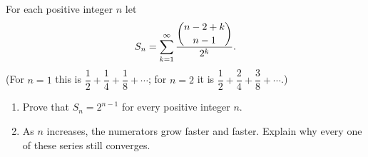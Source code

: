 For each positive integer $n$ let
\[S_n=\sum_{k=1}^{\infty}\dfrac{\dbinom{n-2+k}{n-1}}{2^k}.\]
(For $n=1$ this is $\dfrac12+\dfrac14+\dfrac18+\cdots$; for $n=2$ it is $\dfrac12+\dfrac24+\dfrac38+\cdots$.)
\begin{enumerate}
\item[(a)] Prove that $S_n=2^{n-1}$ for every positive integer $n$.
\item[(b)] As $n$ increases, the numerators grow faster and faster. Explain why every one of these series still converges.
\end{enumerate}
